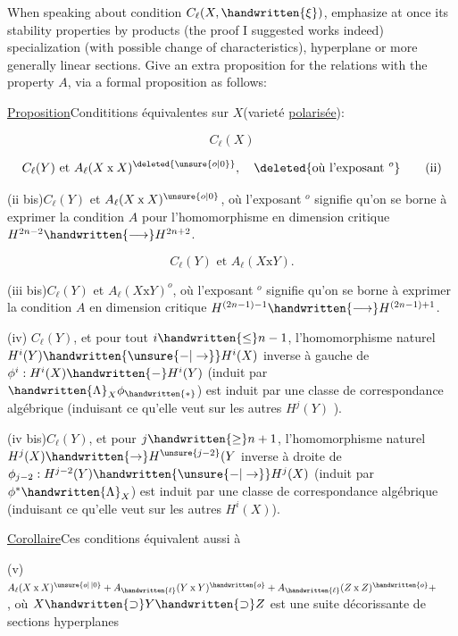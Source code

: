 When speaking about condition $C_{\ell}(X,\handwritten{\xi})$, emphasize at once its stability
properties by products (the proof I suggested works indeed) specialization
(with possible change of characteristics), hyperplane or more generally
linear sections. Give an extra proposition for the relations with the
property $A$, via a formal proposition as follows:

\uline{Proposition}\quad Condititions équivalentes sur $X$(varieté \uline{polarisée}):

\[
C_{\ell}(X) \tag*{(i)}
\]

\[
C_{\ell}(Y)\text{ et }A_{\ell}(X\mathbin{\mathrm{x}}X)^{\deleted{\unsure{o|0}}},\quad
\deleted{\text{où l'exposant }{}^{o}} \tag*{(ii)}
\]

(ii bis)\quad $C_{\ell}(Y)$ et $A_{\ell}(X\mathbin{\mathrm{x}}X)^{\unsure{o|0}}$, où l'exposant $^{o}$ signifie qu'on se borne
à exprimer la condition $A$ pour l'homomorphisme en dimension critique
$H^{2n-2}\handwritten{\longrightarrow}H^{2n+2}$.

\[
C_{\ell}(Y)\text{ et }A_{\ell}(X\mathbin{\mathrm{x}}Y). \tag*{(iii)}
\]

(iii bis)\quad $C_{\ell}(Y)$ et $A_{\ell}(X\mathbin{\mathrm{x}}Y)^{o}$, où l'exposant $^{o}$ signifie qu'on se borne
à exprimer la condition $A$ en dimension critique $H^{(2n-1)-1}\handwritten{\longrightarrow}H^{(2n-1)+1}$.

(iv)\quad {} $C_{\ell}(Y)$, et pour tout $i\handwritten{\leq} n-1$, l'homomorphisme
naturel $H^{i}(Y)\handwritten{\unsure{-|\to}}H^{i}(X)$ inverse à gauche de $\phi^{i}:H^{i}(X)\handwritten{-}H^{i}(Y)$ (induit
par $\handwritten{\Lambda}_{X}\phi_{\handwritten{*}}$) est induit par une classe de correspondance algébrique (induisant ce qu'elle veut sur les autres $H^{j}(Y)$ ).

(iv bis)\quad $C_{\ell}(Y)$, et pour $j\handwritten{\geq} n+1$, l'homomorphisme naturel $H^{j}(X)\handwritten{\to}H^{\unsure{j-2}}(Y$
inverse à droite de $\phi_{j-2}:H^{j-2}(Y)\handwritten{\unsure{-|\to}}H^{j}(X)$  (induit par $\phi^{*}\handwritten{\Lambda}_{X}$) est
induit par une classe de correspondance algébrique (induisant ce qu'elle
veut sur les autres $H^{i}(X)$).

\uline{Corollaire}\quad {}Ces conditions équivalent aussi à

(v)\quad $A_{\ell}(X\mathbin{\mathrm{x}}X)^{\unsure{o|\,|0}}+A_{\handwritten{\ell}}(Y\mathbin{\mathrm{x}}Y)^{\handwritten{o}}+A_{\handwritten{\ell}}(Z\mathbin{\mathrm{x}}Z)^{\handwritten{o}}+\hspace{2em}$, où $X\handwritten{\supset}Y\handwritten{\supset}Z$ est une
suite décorissante de sections hyperplanes

